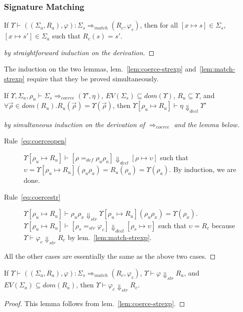 \subsubsection{Signature Matching}
\begin{lemma}\label{lem:matchrealizes}
If $\Upsilon \vdash ((\Sigma_a,R_a),\varphi) : \Sigma_s \Rightarrow_{match} (R_c,
\varphi_c)$, then for all $[x\mapsto s]\in\Sigma_s$, $[x\mapsto
s']\in\Sigma_a$ such that $R_c(s)=s'$.
\end{lemma}
\begin{proof}[by straightforward induction on the derivation]
\end{proof}

The induction on the two lemmas, lem.~\ref{lem:coerce-strexp}
and~\ref{lem:match-strexp} require that they be proved
simultaneously. 

\begin{lemma}\label{lem:coerce-strexp}
If $\Upsilon,\Sigma_a,\rho_u \vdash \Sigma_s 
\Rightarrow_{coerce} (\Upsilon', \eta)$, $EV(\Sigma_s)\subseteq
dom(\Upsilon)$, 
$R_u \subseteq \Upsilon$, 
and $\forall\vec{\rho}\in dom(R_u).R_u(\vec{\rho}) = \Upsilon(\vec{\rho})$, 
then $\Upsilon[\rho_u\mapsto R_u] \vdash \eta 
\Downarrow_{decl} \Upsilon'$
\end{lemma}
\begin{proof}[by simultaneous induction on the derivation of
  $\Rightarrow_{coerce}$ and the lemma below]
\begin{description}
\item[Rule~\ref{eq:coerceopen}] $\Upsilon[\rho_u\mapsto R_u] \vdash 
[\rho=_{def}\rho_u\rho_a]
  \Downarrow_{decl} [\rho \mapsto \upsilon]$ such that $\upsilon =
  \Upsilon[\rho_u\mapsto R_u](\rho_u\rho_a) =
  R_u(\rho_a)=\Upsilon(\rho_a)$.
By induction, we are done. 
\item[Rule~\ref{eq:coercestr}] $\Upsilon[\rho_u\mapsto R_u]\vdash \rho_u\rho_x
  \Downarrow_{str} \Upsilon[\rho_u\mapsto R_u](\rho_u\rho_x) = \Upsilon(\rho_x)$.  
$\Upsilon[\rho_u\mapsto R_u] \vdash
  [\rho_s=_{str} \varphi_c] \Downarrow_{decl} [\rho_s\mapsto
  \upsilon]$ such that $\upsilon=R_c$ because $\Upsilon\vdash\varphi_c
  \Downarrow_{str} R_c$ by lem.~\ref{lem:match-strexp}.
\end{description}
All the other cases are essentially the same as the above two cases.   
\end{proof}

\begin{lemma}\label{lem:match-strexp}
If $\Upsilon \vdash ((\Sigma_a,R_a),\varphi) : \Sigma_s
\Rightarrow_{match} (R_c,\varphi_c)$,
$\Upsilon\vdash\varphi\Downarrow_{str} R_a$, and $EV(\Sigma_a)\subseteq
dom(R_a)$, 
then $\Upsilon\vdash \varphi_c \Downarrow_{str} R_c$. 
\end{lemma}
\begin{proof}
This lemma follows from lem.~\ref{lem:coerce-strexp}.
\end{proof}


